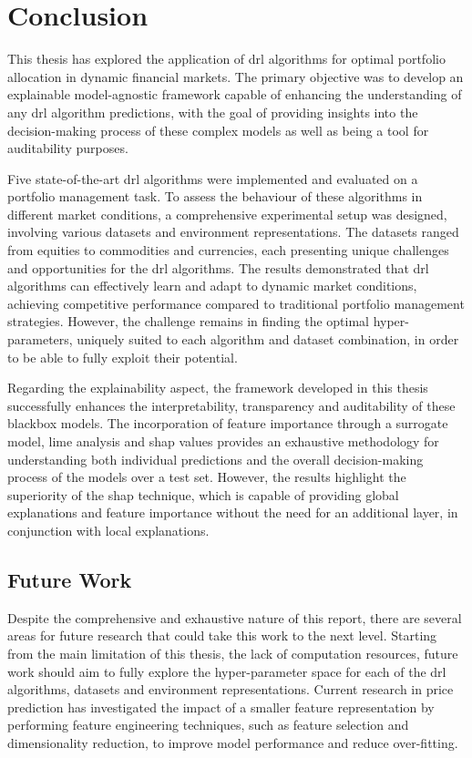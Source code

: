 \chapter{Conclusion} \label{ch:conclusion}

This thesis has explored the application of \acrfull{drl} algorithms for optimal portfolio allocation in dynamic financial markets. The primary objective was to develop an explainable model-agnostic framework capable of enhancing the understanding of any \acrshort{drl} algorithm predictions, with the goal of providing insights into the decision-making process of these complex models as well as being a tool for auditability purposes. 

Five state-of-the-art \acrshort{drl} algorithms were implemented and evaluated on a portfolio management task. To assess the behaviour of these algorithms in different market conditions, a comprehensive experimental setup was designed, involving various datasets and environment representations. The datasets ranged from equities to commodities and currencies, each presenting unique challenges and opportunities for the \acrshort{drl} algorithms. The results demonstrated that \acrshort{drl} algorithms can effectively learn and adapt to dynamic market conditions, achieving competitive performance compared to traditional portfolio management strategies. However, the challenge remains in finding the optimal hyper-parameters, uniquely suited to each algorithm and dataset combination, in order to be able to fully exploit their potential.

Regarding the explainability aspect, the framework developed in this thesis successfully enhances the interpretability, transparency and auditability of these \gls{blackbox} models. The incorporation of feature importance through a surrogate model, \acrfull{lime} analysis and \acrfull{shap} values provides an exhaustive methodology for understanding both individual predictions and the overall decision-making process of the models over a test set. However, the results highlight the superiority of the \acrshort{shap} technique, which is capable of providing global explanations and feature importance without the need for an additional layer, in conjunction with local explanations. 

\section{Future Work} \label{sec:future-work}

Despite the comprehensive and exhaustive nature of this report, there are several areas for future research that could take this work to the next level. Starting from the main limitation of this thesis, the lack of computation resources, future work should aim to fully explore the hyper-parameter space for each of the \acrshort{drl} algorithms, datasets and environment representations. Current research in price prediction has investigated the impact of a smaller feature representation by performing feature engineering techniques, such as feature selection and dimensionality reduction, to improve model performance and reduce over-fitting.

